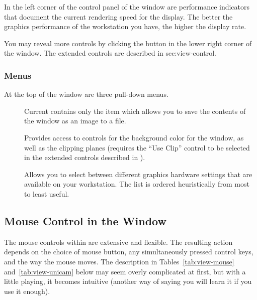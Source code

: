 In the left corner of the control panel of the \viewer{} window are
performance indicators that document the current rendering speed for the
display.  The better the graphics performance of the workstation you
have, the higher the display rate.

You may reveal more controls by clicking the
\latexhtml{\fbox{+}}{\button{[+]}} button in the lower right corner of
the \viewer{} window.  The extended controls are described in
 {sec:view-control}.


\subsubsection{Menus}

At the top of the \viewer{} window are three pull-down menus.

\begin{description}
  \item [] \mbox{}

    Current contains only the  item which
    allows you to save the contents of the \viewer{} window as an
    image to a file.

  \item []\mbox{} 
    
    Provides access to controls for the background color for the
    window, as well as the clipping planes (requires the ``Use Clip''
    control to be selected in the extended controls described in
    ).

  \item []\mbox{}
    
    Allows you to select between different graphics hardware settings
    that are available on your workstation.  The list is ordered
    heuristically from most to least useful.

\end{description}

\subsection{Mouse Control in the \viewer{} Window}
\label{sec:view-mouse} 

The mouse controls within \SR{} are extensive and flexible.  The
resulting action depends on the choice of mouse button, any
simultaneously pressed control keys, and the way the mouse moves.  The
description in Tables~\ref{tab:view-mouse} and~\ref{tab:view-unicam}
below may seem overly complicated at first, but with a little playing,
it becomes intuitive (another way of saying you will learn it if you
use it enough).

